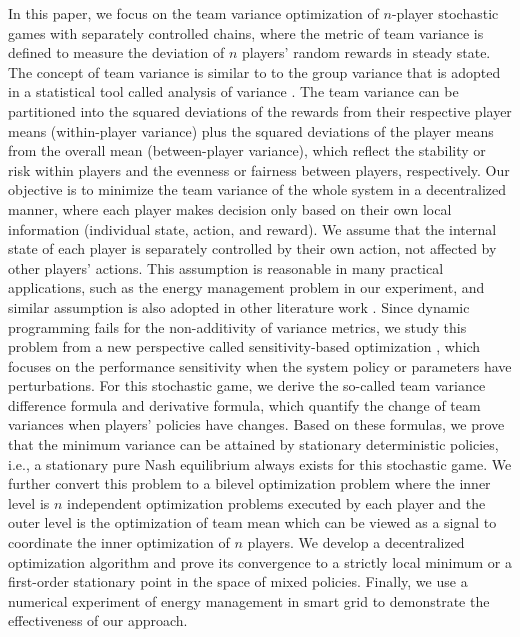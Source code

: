 \documentclass[12pt]{article}
\begin{document}
In this paper, we focus on the team variance optimization of
$n$-player stochastic games with separately controlled chains, where
the metric of team variance is defined to measure the deviation of
$n$ players' random rewards in steady state. The concept of team
variance is similar to to the group variance that is adopted in a
statistical tool called analysis of variance
\citep{Fisher25,Sawyer09}. The team variance can be partitioned into
the squared deviations of the rewards from their respective player
means (within-player variance) plus the squared deviations of the
player means from the overall mean (between-player variance), which
reflect the stability or risk within players and the evenness or
fairness between players, respectively. Our objective is to minimize
the team variance of the whole system in a decentralized manner,
where each player makes decision only based on their own local
information (individual state, action, and reward). We assume that
the internal state of each player is separately controlled by their
own action, not affected by other players' actions. This assumption
is reasonable in many practical applications, such as the energy
management problem in our experiment, and similar assumption is also
adopted in other literature work \citep{Etesami24}. Since dynamic
programming fails for the non-additivity of variance metrics, we
study this problem from a new perspective called sensitivity-based
optimization \citep{Cao07}, which focuses on the performance
sensitivity when the system policy or parameters have perturbations.
For this stochastic game, we derive the so-called team variance
difference formula and derivative formula, which quantify the change
of team variances when players' policies have changes. Based on
these formulas, we prove that the minimum variance can be attained
by stationary deterministic policies, i.e., a stationary pure Nash
equilibrium always exists for this stochastic game. We further
convert this problem to a bilevel optimization problem where the
inner level is $n$ independent optimization problems executed by
each player and the outer level is the optimization of team mean
which can be viewed as a signal to coordinate the inner optimization
of $n$ players. We develop a decentralized optimization algorithm
and prove its convergence to a strictly local minimum or a
first-order stationary point in the space of mixed policies.
Finally, we use a numerical experiment of energy management in smart
grid to demonstrate the effectiveness of our approach.
\end{document}
